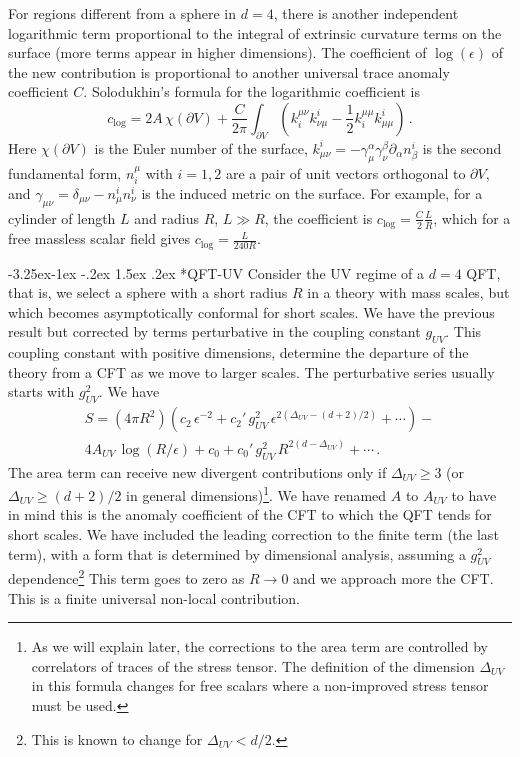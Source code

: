 \documentclass[11pt]{article}
\makeatletter
\renewcommand\subsubsection{\@startsection{subsubsection}{3}{\z@}%
                                   {-3.25ex\@plus -1ex \@minus -.2ex}%
                                     {1.5ex \@plus .2ex}%
                                     {\normalfont\itshape}}
\numberwithin{equation}{section}
\makeatother
\begin{document}
 For regions different from a sphere in $d=4$, there is another independent logarithmic term  proportional to the integral of extrinsic curvature terms on the surface (more terms appear in higher dimensions). The coefficient of $\log(\epsilon)$ of the new contribution is proportional to another universal trace anomaly coefficient $C$. Solodukhin's formula for the logarithmic coefficient is
\begin{equation}
c_{\textrm{log}}=2A \,\chi(\partial V)+\frac{C}{2 \pi}   \int_{\partial V}(k_i^{\mu \nu}k^i_{\nu \mu} -\frac{1}{2} k_i^{\mu \mu}k^i_{\mu \mu})\,.\label{general}
\end{equation}
Here $\chi(\partial V)$ is the Euler number of the surface,  $k^i_{\mu\nu}=-\gamma^\alpha_\mu \gamma^\beta_\nu \partial_\alpha n^i_\beta$ is 
the second fundamental form, $n^\mu_i$ with $i=1,2$ are a pair of unit vectors orthogonal to $\partial V$, and $\gamma_{\mu\nu}=\delta_{\mu\nu}-n^i_\mu n^i_\nu$ is 
the induced metric on the surface. 
For example, for a cylinder of length $L$ and radius $R$, $L\gg R$, the coefficient is $c_{\textrm{log}}=\frac{C}{2}\frac{L}{R}$, which for a free massless scalar field gives $c_{\textrm{log}}=\frac{L}{240 R}$.



\subsubsection*{QFT-UV}
Consider the UV regime of a $d=4$ QFT, that is, we select a sphere with a short radius $R$ in a theory with mass scales, but which becomes asymptotically conformal for short scales.  We have the previous result but corrected by terms perturbative in the coupling constant $g_{UV}$. This coupling constant with positive dimensions, determine the departure of the theory from a CFT as we move to larger scales. The perturbative series usually starts with $g_{UV}^2$. We have 
\begin{multline}
S=(4 \pi R^2)\left(c_2 \,\epsilon^{-2}+ c_{2}'\,g_{UV}^2 \,\epsilon^{2 \left(\Delta_{UV} -(d+2)/2\right)} +\cdots\right)- \\
4 A_{UV} \, \log(R/\epsilon) +c_0 +c_0'\, g_{UV}^2 \, R^{2(d-\Delta_{UV})}+\cdots\,.\label{uvi}
\end{multline}
The area term can receive new divergent contributions only if $\Delta_{UV}\ge 3$ (or $\Delta_{UV}\ge (d+2)/2$ in general dimensions)\footnote{As we will explain later, the corrections to the area term are controlled by correlators of traces of the stress tensor. The definition of the dimension $\Delta_{UV}$ in this formula changes for free scalars where a non-improved stress tensor must be used.}. We have renamed $A$ to $A_{UV}$ to have in mind this is the anomaly coefficient of the CFT to which the QFT tends for short scales. We have included the leading correction to the finite term (the last term), with a form that is determined by dimensional analysis,  assuming a $g_{UV}^2$ dependence\footnote{This is known to change for $\Delta_{UV}<d/2$.} This term goes to zero as $R\rightarrow 0$ and we approach more the CFT. This is a finite universal non-local contribution.  
\end{document}
